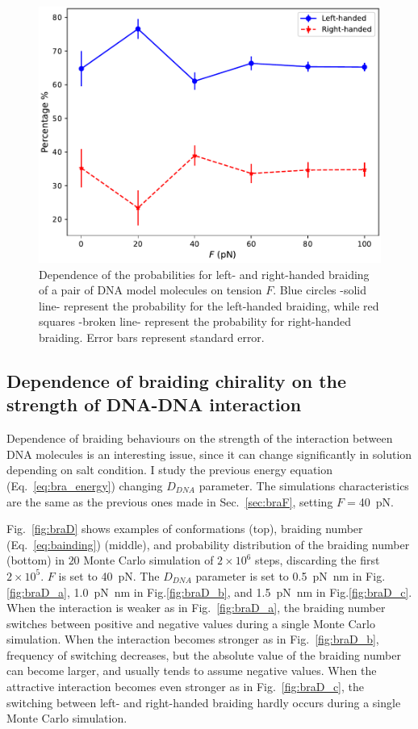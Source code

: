 \documentclass[a4paper,10pt]{article}
\begin{document}
\begin{figure}[htbp]
\centering
\includegraphics[width=.6\textwidth]{brF_br_gr.pdf}
\caption{Dependence of the probabilities for left- and right-handed braiding of a pair of DNA model molecules on tension $F$.
Blue circles -solid line- represent the probability for the left-handed braiding, while red squares -broken line- represent the probability for right-handed braiding.
Error bars represent standard error.}
\label{fig:braF_pr}
\end{figure}

\subsection{Dependence of braiding chirality on the strength of DNA-DNA interaction}
Dependence of braiding behaviours on the strength of the interaction between DNA molecules is an interesting issue, since it can change significantly in solution depending on salt condition.
I study the previous energy equation (Eq.~\ref{eq:bra_energy}) changing $D_{DNA}$ parameter.
The simulations characteristics are the same as the previous ones made in Sec.~\ref{sec:braF}, setting $F=$\SI{40}{\pico\newton}.

Fig.~\ref{fig:braD} shows examples of conformations (top), braiding number (Eq.~\ref{eq:bainding}) (middle), and probability distribution of the braiding number (bottom) in $20$ Monte Carlo simulation of $2\times 10^6$ steps, discarding the first $2\times 10^5$.
$F$ is set to \SI{40}{\pico\newton}.
The $D_{DNA}$ parameter is set to \SI{0.5}{\pico\newton\nano\meter} in Fig.\ref{fig:braD_a}, \SI{1.0}{\pico\newton\nano\meter} in Fig.\ref{fig:braD_b}, and \SI{1.5}{\pico\newton\nano\meter} in Fig.\ref{fig:braD_c}.
When the interaction is weaker as in Fig.~\ref{fig:braD_a}, the braiding number switches between positive and negative values during a single Monte Carlo simulation.
When the interaction becomes stronger as in Fig.~\ref{fig:braD_b}, frequency of switching decreases, but the absolute value of the braiding number can become larger, and usually tends to assume negative values.
When the attractive interaction becomes even stronger as in Fig.~\ref{fig:braD_c}, the switching between left- and right-handed braiding hardly occurs during a single Monte Carlo simulation.
\end{document}
